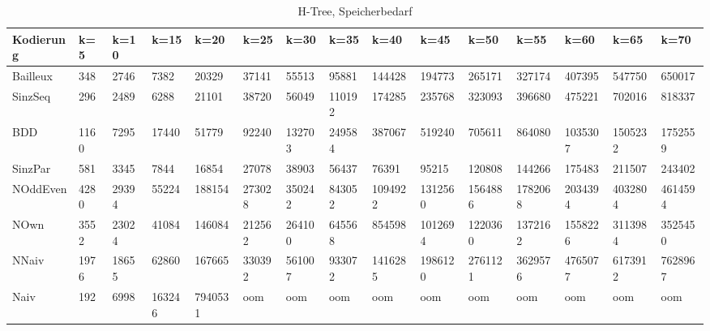 \documentclass[a4,abstract=on]{scrartcl}
\begin{document}
\begin{landscape}
 \begin{table}[h!]
    \small
    \setlength{\tabcolsep}{0.11cm}
     \centering
     \begin{tabular}[width=\textwidth]{|l||l|l|l|l|l|l|l|l|l|l|l|l|l|l|}
	\hline
       \textbf{Kodierung}  & \textbf{k=5} & \textbf{k=10} & \textbf{k=15} &\textbf{k=20} &\textbf{k=25} &\textbf{k=30} &\textbf{k=35} &\textbf{k=40} &\textbf{k=45} &\textbf{k=50} &\textbf{k=55} &\textbf{k=60} &\textbf{k=65} &\textbf{k=70}\\
	\hline
	\hline
	Bailleux & 348 & 2746 & 7382  & 20329 & 37141 & 55513 & 95881 & 144428 & 194773 & 265171 & 327174 & 407395 & 547750 & 650017\\
\hline
	SinzSeq & 296 & 2489 & 6288 & 21101 & 38720 & 56049 & 110192 & 174285 & 235768 & 323093 & 396680 & 475221 & 702016 & 818337 \\
\hline
	BDD & 1160 & 7295 & 17440 & 51779 & 92240 & 132703 & 249584 & 387067 & 519240 & 705611 & 864080 & 1035307 & 1505232 & 1752559\\
\hline
	SinzPar & 581 & 3345 & 7844 & 16854 & 27078 & 38903 & 56437 & 76391 & 95215 & 120808 & 144266 & 175483 & 211507 & 243402\\
\hline
	NOddEven & 4280 & 29394 & 55224 & 188154 & 273028 & 350242 & 843052 & 1094922 & 1312560 & 1564886 & 1782068 & 2034394 & 4032804 & 4614594\\
\hline
	NOwn & 3552 & 23024 & 41084 & 146084 & 212562 & 264100 & 645568 & 854598 & 1012694 & 1220360 & 1372162 & 1558226 & 3113984 & 3525450\\
 \hline
	NNaiv & 1976 & 18655 & 62860 & 167665 & 330392 & 561007 & 933072 & 1416285 & 1986120 & 2761121 & 3629576 & 4765077 & 6173912 & 7628967\\
\hline
	Naiv & 192 & 6998 & 163246 & 7940531 &  oom &  oom &  oom &  oom &  oom &  oom &  oom &  oom &  oom &  oom\\
\hline
       
     \end{tabular}

     \caption{H-Tree, Speicherbedarf}
     \label{tbl:beispieltabelle}

   \end{table}



\end{landscape}
\end{document}
